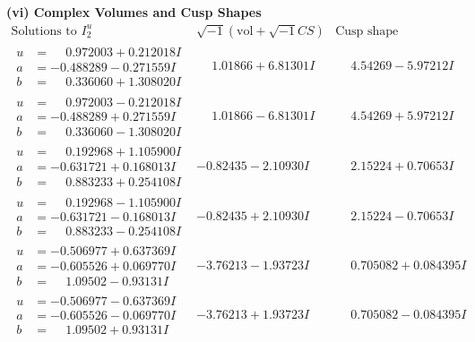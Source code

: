 \documentclass[1p]{elsarticle_modified}
\theoremstyle{definition}
\newcommand{\I}{\sqrt{-1}}
\begin{document}
\newpage\flushleft \textbf{(vi) Complex Volumes and Cusp Shapes}
$$\begin{array}{c|c|c}  
\text{Solutions to }I^u_{2}& \I (\text{vol} + \sqrt{-1}CS) & \text{Cusp shape}\\
 \hline 
\begin{aligned}
u &= \phantom{-}0.972003 + 0.212018 I \\
a &= -0.488289 - 0.271559 I \\
b &= \phantom{-}0.336060 + 1.308020 I\end{aligned}
 & \phantom{-}1.01866 + 6.81301 I & \phantom{-}4.54269 - 5.97212 I \\ \hline\begin{aligned}
u &= \phantom{-}0.972003 - 0.212018 I \\
a &= -0.488289 + 0.271559 I \\
b &= \phantom{-}0.336060 - 1.308020 I\end{aligned}
 & \phantom{-}1.01866 - 6.81301 I & \phantom{-}4.54269 + 5.97212 I \\ \hline\begin{aligned}
u &= \phantom{-}0.192968 + 1.105900 I \\
a &= -0.631721 + 0.168013 I \\
b &= \phantom{-}0.883233 + 0.254108 I\end{aligned}
 & -0.82435 - 2.10930 I & \phantom{-}2.15224 + 0.70653 I \\ \hline\begin{aligned}
u &= \phantom{-}0.192968 - 1.105900 I \\
a &= -0.631721 - 0.168013 I \\
b &= \phantom{-}0.883233 - 0.254108 I\end{aligned}
 & -0.82435 + 2.10930 I & \phantom{-}2.15224 - 0.70653 I \\ \hline\begin{aligned}
u &= -0.506977 + 0.637369 I \\
a &= -0.605526 + 0.069770 I \\
b &= \phantom{-}1.09502 - 0.93131 I\end{aligned}
 & -3.76213 - 1.93723 I & \phantom{-}0.705082 + 0.084395 I \\ \hline\begin{aligned}
u &= -0.506977 - 0.637369 I \\
a &= -0.605526 - 0.069770 I \\
b &= \phantom{-}1.09502 + 0.93131 I\end{aligned}
 & -3.76213 + 1.93723 I & \phantom{-}0.705082 - 0.084395 I \\ \hline\begin{aligned}

\end{aligned}
\end{array}$$
\end{document}

